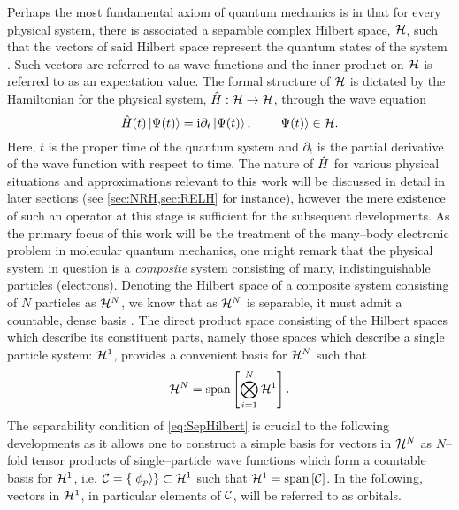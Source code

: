 Perhaps the most fundamental axiom of quantum mechanics is in that for every physical
system, there is associated a separable complex Hilbert space, $\mathcal{H}$, such that
the vectors of said Hilbert space represent the quantum states 
of the system \cite{VonNeumann55_book}. Such vectors are referred to as wave functions
and the inner product on $\mathcal{H}$ is referred to as an expectation value.
The formal structure of $\mathcal{H}$ is dictated by the Hamiltonian
for the physical system, $\hat{H} : \mathcal{H} \rightarrow \mathcal{H}$, through the wave equation
\begin{equation}
  \label{eq:QWave}
\hat{H}(t) \left\vert \Psi(t) \right\rangle = \mathrm i \partial_t \left\vert \Psi(t) \right\rangle, 
  \qquad \left\vert \Psi(t) \right\rangle \in \mathcal{H}.
\end{equation}
Here, $t$ is the proper time of the quantum system and $\partial_t$ is the partial derivative
of the wave function with respect to time.
The nature of $\hat{H}$ for various physical situations and approximations relevant
to this work will be discussed in detail in later sections 
(see \cref{sec:NRH,sec:RELH} for instance), however the mere existence of such
an operator at this stage is sufficient for the subsequent developments.
As the primary focus of this work will be the treatment of the many--body electronic
problem in molecular quantum mechanics, one might remark that the physical system
in question is a \emph{composite} system consisting of many, indistinguishable 
particles (electrons). Denoting the Hilbert space of a composite system consisting
of $N$ particles as $\mathcal{H}^N$, we know that as $\mathcal{H}^N$ is separable,
it must admit a countable, dense basis \cite{Lee03_book}.
The direct product space consisting of the Hilbert spaces
which describe its constituent parts, namely those spaces which describe a
single particle system: $\mathcal{H}^1$, provides a convenient basis for $\mathcal{H}^N$ such that
\begin{equation}
  \label{eq:SepHilbert}
  \mathcal{H}^N = \mathrm{span}\left[ \bigotimes_{i = 1}^N \mathcal{H}^1 \right].
\end{equation}
The separability condition of \cref{eq:SepHilbert} is crucial to the following developments
as it allows one to construct a simple basis for vectors in $\mathcal{H}^N$
as $N$--fold tensor products of single--particle wave functions which form a countable basis for $\mathcal{H}^1$, 
i.e. $\mathcal{C} = \left \lbrace \left\vert \phi_p \right\rangle \right\rbrace  \subset \mathcal{H}^1$ such that 
$\mathcal{H}^1 = \mathrm{span}\left[ \mathcal{C} \right]$. In the following, vectors in $\mathcal{H}^1$, in particular elements of $\mathcal{C}$,
will be referred to as orbitals.

